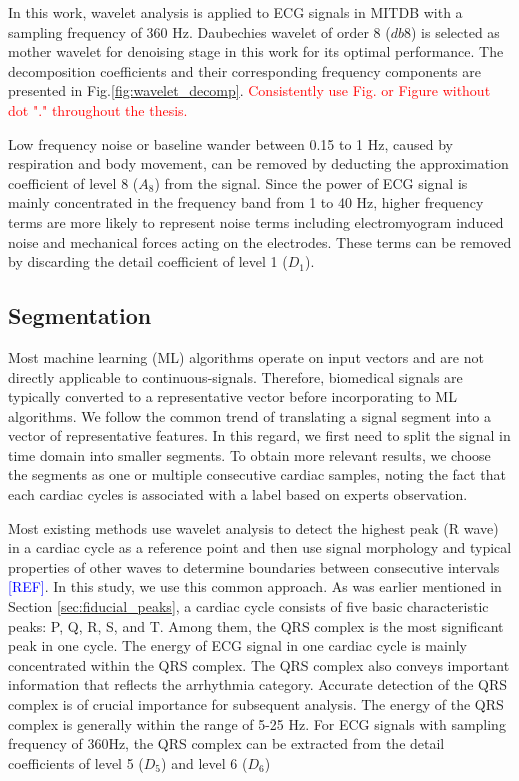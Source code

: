 In this work, wavelet analysis is applied to ECG signals in MITDB with a sampling frequency of 360 Hz. Daubechies wavelet of order 8 ($db8$) is selected as mother wavelet for denoising stage in this work for its optimal performance\cite{denoise}. The decomposition coefficients and their corresponding frequency components are presented in Fig.\ref{fig:wavelet_decomp}. \textcolor{red}{Consistently use Fig. or Figure without dot "." throughout the thesis.}

Low frequency noise or baseline wander between 0.15 to 1 Hz, caused by respiration and body movement, can be removed by deducting the approximation coefficient of level 8 ($A_8$) from the signal. Since the power of ECG signal is mainly concentrated in the frequency band from 1 to 40 Hz, higher frequency terms are more likely to represent noise terms including electromyogram induced noise and mechanical forces acting on the electrodes. These terms can be removed by discarding the detail coefficient of level 1 ($D_1$). 

\subsection{Segmentation}

Most machine learning (ML) algorithms operate on input vectors and are not directly applicable to continuous-signals. Therefore, biomedical signals are typically converted to a representative vector before incorporating to ML algorithms. We follow the common trend of translating a signal segment into a vector of representative features. In this regard, we first need to split the signal in time domain into smaller segments. To obtain more relevant results, we choose the segments as one or multiple consecutive cardiac samples, noting the fact that each cardiac cycles is associated with a label based on experts observation. 

Most existing methods use wavelet analysis to detect the highest peak (R wave) in a cardiac cycle as a reference point and then use signal morphology and typical properties of other waves to determine boundaries between consecutive intervals \textcolor{blue}{[REF]}. In this study, we use this common approach. As was earlier mentioned in Section \ref{sec:fiducial_peaks}, a cardiac cycle consists of five basic characteristic peaks: P, Q, R, S, and T. Among them, the QRS complex is the most significant peak in one cycle. The energy of ECG signal in one cardiac cycle is mainly concentrated within the QRS complex. The QRS complex also conveys important information that reflects the arrhythmia category\cite{2012qrs}. Accurate detection of the QRS complex is of crucial importance for subsequent analysis. The energy of the QRS complex is generally within the range of 5-25 Hz. For ECG signals with sampling frequency of 360Hz, the QRS complex can be extracted from the detail coefficients of level 5 ($D_5$) and level 6 ($D_6$)

